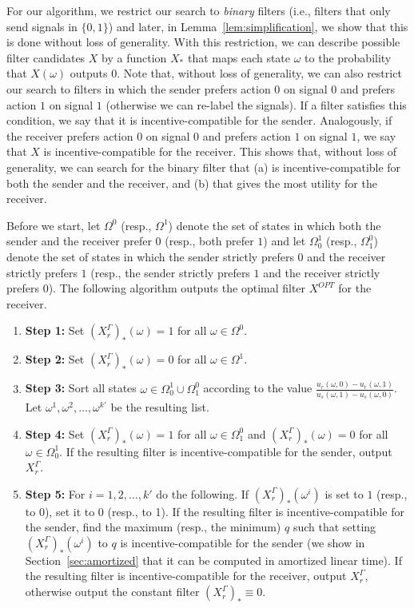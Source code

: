 \documentclass[submission,copyright,creativecommons]{eptcs}
\begin{document}
For our algorithm, we restrict our search to \emph{binary} filters (i.e., filters that only send signals in $\{0,1\}$) and later, in Lemma~\ref{lem:simplification}, we show that this is done without loss of generality. With this restriction, we can describe possible filter candidates $X$ by a function $X_*$ that maps each state $\omega$ to the probability that $X(\omega)$ outputs $0$. Note that, without loss of generality, we can also restrict our search to filters in which the sender prefers action $0$ on signal $0$ and prefers action $1$ on signal $1$ (otherwise we can re-label the signals). If a filter satisfies this condition, we say that it is incentive-compatible for the sender. Analogously, if the receiver prefers action $0$ on signal $0$ and prefers action $1$ on signal $1$, we say that $X$ is incentive-compatible for the receiver. This shows that, without loss of generality, we can search for the binary filter that (a) is incentive-compatible for both the sender and the receiver, and (b) that gives the most utility for the receiver.

Before we start, let $\Omega^0$ (resp., $\Omega^1$) denote the set of states in which both the sender and the receiver prefer $0$ (resp., both prefer $1$) and let $\Omega_0^1$ (resp., $\Omega_1^0$) denote the set of states in which the sender strictly prefers $0$ and the receiver strictly prefers $1$ (resp., the sender strictly prefers $1$ and the receiver strictly prefers $0$). The following algorithm outputs the optimal filter $X^{OPT}$ for the receiver. 

\begin{enumerate}
\item \textbf{Step 1:} Set $(X_r^\Gamma)_*(\omega) = 1$ for all $\omega \in \Omega^0$.
\item \textbf{Step 2:} Set $(X_r^\Gamma)_*(\omega) = 0$ for all $\omega \in \Omega^1$.
\item \textbf{Step 3:} Sort all states $\omega \in \Omega_{0}^1 \cup \Omega_1^0$ according to the value $\frac{u_r(\omega, 0) - u_r(\omega, 1)}{u_s(\omega, 1) - u_s(\omega, 0)}$. Let $\omega^1, \omega^2, \ldots, \omega^{k'}$ be the resulting list.
\item \textbf{Step 4:} Set $(X_r^\Gamma)_*(\omega) = 1$ for all $\omega \in \Omega_1^0$ and $(X_r^\Gamma)_*(\omega) = 0$ for all $\omega \in \Omega_0^1$. If the resulting filter is incentive-compatible for the sender, output $X_r^\Gamma$.
\item \textbf{Step 5:} For $i = 1, 2, \ldots, k'$ do the following. If $(X_r^\Gamma)_*(\omega^i)$ is set to $1$ (resp., to $0$), set it to $0$ (resp., to 1). If the resulting filter is incentive-compatible for the sender, find the maximum (resp., the minimum) $q$ such that setting $(X_r^\Gamma)_*(\omega^i)$ to $q$ is incentive-compatible for the sender (we show in Section~\ref{sec:amortized} that it can be computed in amortized linear time). If the resulting filter  is incentive-compatible for the receiver, output $X_r^\Gamma$, otherwise output the constant filter $(X_r^\Gamma)_* \equiv 0$.
\end{enumerate}
\end{document}

